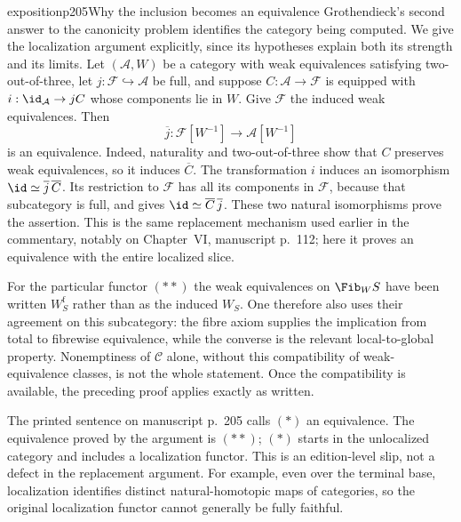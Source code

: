 \begin{dcomment}{exposition}{p205}{Why the inclusion becomes an equivalence}
Grothendieck's second answer to the canonicity problem identifies the category being computed. We give the localization argument explicitly, since its hypotheses explain both its strength and its limits. Let $(\mathcal A,W)$ be a category with weak equivalences satisfying two-out-of-three, let $j:\mathcal F\hookrightarrow\mathcal A$ be full, and suppose $C:\mathcal A\to\mathcal F$ is equipped with $i:\id_{\mathcal A}\to jC$ whose components lie in $W$. Give $\mathcal F$ the induced weak equivalences. Then
\[
 \overline j:\mathcal F[W^{-1}]\longrightarrow\mathcal A[W^{-1}]
\]
is an equivalence. Indeed, naturality and two-out-of-three show that $C$ preserves weak equivalences, so it induces $\overline C$. The transformation $i$ induces an isomorphism $\id\simeq\overline j\,\overline C$. Its restriction to $\mathcal F$ has all its components in $\mathcal F$, because that subcategory is full, and gives $\id\simeq\overline C\,\overline j$. These two natural isomorphisms prove the assertion. This is the same replacement mechanism used earlier in the commentary, notably on Chapter~VI, manuscript p.~112; here it proves an equivalence with the entire localized slice.

For the particular functor $(**)$ the weak equivalences on $\Fib_W S$ have been written $W_S^{\mathrm f}$ rather than as the induced $W_S$. One therefore also uses their agreement on this subcategory: the fibre axiom supplies the implication from total to fibrewise equivalence, while the converse is the relevant local-to-global property. Nonemptiness of $\mathcal C$ alone, without this compatibility of weak-equivalence classes, is not the whole statement. Once the compatibility is available, the preceding proof applies exactly as written.

The printed sentence on manuscript p.~205 calls $(*)$ an equivalence. The equivalence proved by the argument is $(**)$; $(*)$ starts in the unlocalized category and includes a localization functor. This is an edition-level slip, not a defect in the replacement argument. For example, even over the terminal base, localization identifies distinct natural-homotopic maps of categories, so the original localization functor cannot generally be fully faithful.


\end{dcomment}
